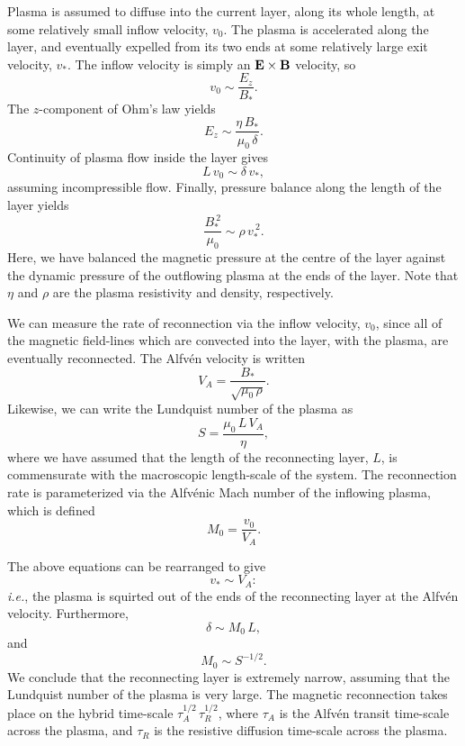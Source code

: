 Plasma is assumed to diffuse into the current layer, along its whole length,
at some relatively small inflow velocity, $v_0$. The plasma is accelerated
along the layer, and eventually expelled from its two ends at some
relatively large exit velocity, $v_\ast$. The inflow velocity
is simply an ${\bf E}\times{\bf B}$ velocity, so
\begin{equation}
v_0 \sim \frac{E_z}{B_\ast}.
\end{equation}
The $z$-component of Ohm's law yields
\begin{equation}
E_z \sim \frac{\eta\,B_\ast}{\mu_0\,\delta}.
\end{equation}
Continuity of plasma flow inside the layer gives
\begin{equation}
L\,v_0 \sim \delta\,v_\ast,
\end{equation}
assuming incompressible flow.
Finally, pressure balance along the length of the layer yields
\begin{equation}
\frac{B_\ast^{~2}}{\mu_0} \sim \rho\,v_\ast^{~2}.
\end{equation}
Here, we have balanced the magnetic pressure at the centre of the layer
against the dynamic pressure of the outflowing plasma at the  ends of the
layer. Note that $\eta$ and $\rho$ are the plasma resistivity and density,
respectively.

We can measure the rate of reconnection via
the inflow velocity, $v_0$, since all of the magnetic field-lines which are
convected into the layer, with the plasma, are eventually reconnected.
The Alfv\'{e}n velocity is written
\begin{equation}
V_A = \frac{B_\ast}{\sqrt{\mu_0\,\rho}}.
\end{equation}
Likewise, we can write the Lundquist number of the plasma as
\begin{equation}
S = \frac{\mu_0\,L\,V_A}{\eta},
\end{equation}
where we have assumed that the length of the reconnecting layer, $L$,
is commensurate with the macroscopic length-scale of the system.
The reconnection rate is parameterized via the Alfv\'{e}nic Mach number of
the inflowing plasma, which is defined
\begin{equation}
M_0  = \frac{v_0}{V_A}.
\end{equation}

The above equations can be rearranged to give
\begin{equation}
v_\ast \sim V_A:
\end{equation}
{\em i.e.}, the plasma is squirted out of the ends of the
reconnecting layer at the Alfv\'{e}n velocity. Furthermore,
\begin{equation}
\delta \sim M_0\,L,
\end{equation}
and
\begin{equation}
M_0 \sim S^{-1/2}.
\end{equation}
We conclude that the reconnecting layer is extremely
narrow, assuming that the Lundquist number of the plasma is
very large. The magnetic reconnection
takes place on the hybrid time-scale $\tau_A^{1/2}\,\tau_R^{1/2}$,
where $\tau_A$ is the Alfv\'{e}n transit time-scale across the
plasma, and $\tau_R$ is the resistive diffusion time-scale across the
plasma. 

